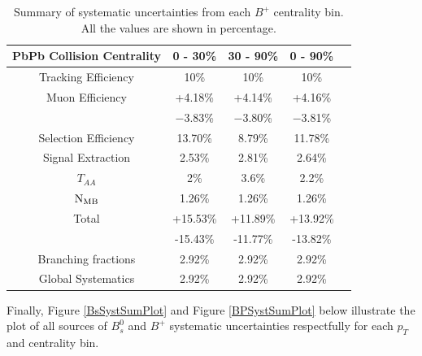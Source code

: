 \begin{table}[h]
\begin{center}
\caption{Summary of systematic uncertainties from each $B^+$ centrality bin. All the values are shown in percentage.}
\vspace{1em}
\label{BsCentSystSum}
\begin{tabular}{ |c | c | c | c | c|}
\hline
PbPb Collision Centrality &  0 - 30\% & 30 - 90\% & 0 - 90\%   \\
\hline
Tracking Efficiency & 10\% & 10\% & 10\% \\
Muon Efficiency     & +4.18\% & +4.14\% & +4.16\%  \\
                                & $-$3.83\% & $-$3.80\% & $-$3.81\%  \\
Selection Efficiency &  13.70\% & 8.79\% & 11.78\%  \\
Signal Extraction & 2.53\%  & 2.81\% & 2.64\%  \\
$T_{AA}$ & 2\% & 3.6\% & 2.2\%\\	
$\rm{N_{MB}}$ & 1.26\% & 1.26\% & 1.26\% \\                                
 Total     &  +15.53\%  & +11.89\% & +13.92\% \\
 	      &  -15.43\%  & -11.77\% & -13.82\% \\
\hline
\hline
    Branching fractions &  2.92\%  &  2.92\%   &  2.92\% \\
      Global Systematics & 2.92\% & 2.92\% &  2.92\%\\ 
 \hline
\end{tabular}
\end{center}
\end{table}


Finally, Figure \ref{BsSystSumPlot} and Figure \ref{BPSystSumPlot} below illustrate the plot of all sources of $B^0_s$ and $B^+$ systematic uncertainties respectfully for each $p_T$ and centrality bin. 

